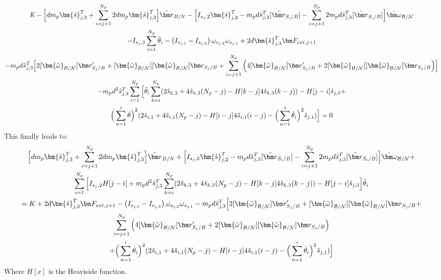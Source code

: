 \begin{multline}
	\textit{K} - \Big[d m_p\bm{\hat{s}}^{T}_{j,3}+\sum^{N_p}_{i=j+1}2 d m_p\bm{\hat{s}}^{T}_{j,3}\Big]\ddot{\bm r}_{B/N} - \Big[I_{s_j,2} \bm{\hat{s}}_{j,2}^T -m_p d \hat{s}^{T}_{j,3}[\tilde{{\bm r}}_{S_{i}/B}]-\sum^{N_p}_{i=j+1} 2 m_p d \hat{s}^{T}_{j,3}[\tilde{{\bm r}}_{S_{i}/B}]\Big]\dot{\bm\omega}_{\cal B/N} \\
	-I_{s_j,2} \sum^{N_p}_{i=1}\ddot{\theta}_i - \left( I_{s_{j,1}} - I_{s_{j,3}}\right) \omega_{s_{j,3}} \omega_{s_{j,1}}+ 2d\bm{\hat{s}}^{T}_{j,3}\bm F_{ext,j+1}\\
	-m_p d \hat{s}^{T}_{j,3}\Big[2[\bm{\tilde{\omega}}_{\cal B/N}]\bm r'_{S_{j}/B} + [\bm{\tilde{\omega}}_{\cal B/N}][\bm{\tilde{\omega}}_{\cal B/N}]\bm r_{S_{j}/B}+\sum^{N_p}_{i=j+1}\Big(4[\bm{\tilde{\omega}}_{\cal B/N}]\bm r'_{S_{j}/B} + 2[\bm{\tilde{\omega}}_{\cal B/N}][\bm{\tilde{\omega}}_{\cal B/N}]\bm r_{S_{j}/B} \Big)\Big]\\
	-m_p d^2 \hat{s}^{T}_{j,3}\sum^{N_p}_{i=1}\Big[\ddot{\theta}_i \sum^{N_p}_{k=i}(2\hat{s}_{k,3}+4\hat{s}_{k,3}(N_p-j) -H[k-j] 4\hat{s}_{k,3}(k-j)) - H[j-i]\hat{s}_{j,3} + \\
	\Big( \sum^{i}_{n=1} \dot{\theta}\Big)^2 (2\hat{s}_{i,1}+4\hat{s}_{i,1}(N_p-j) -H[i-j] 4\hat{s}_{i,1}(i-j) - \Big( \sum^{i}_{n=1} \dot{\theta}_i\Big)^2 \hat{s}_{j,1} ) \Big] = 0
\end{multline}
This finally leads to:
\begin{multline}
	\Big[d m_p\bm{\hat{s}}^{T}_{j,3}+\sum^{N_p}_{i=j+1}2 d m_p\bm{\hat{s}}^{T}_{j,3}\Big]\ddot{\bm r}_{B/N} + \Big[I_{s_j,2} \bm{\hat{s}}_{j,2}^T -m_p d \hat{s}^{T}_{j,3}[\tilde{{\bm r}}_{S_{i}/B}]-\sum^{N_p}_{i=j+1} 2 m_p d \hat{s}^{T}_{j,3}[\tilde{{\bm r}}_{S_{i}/B}]\Big]\dot{\bm\omega}_{\cal B/N} +\\
	\sum^{N_p}_{i=1}\Big[I_{s_j,2} H[j-i] + m_p d^2 \hat{s}^{T}_{j,3} \sum^{N_p}_{k=i}(2\hat{s}_{k,3}+4\hat{s}_{k,3}(N_p-j) -H[k-j] 4\hat{s}_{k,3}(k-j)) - H[j-i]\hat{s}_{j,3} \Big] \ddot{\theta}_i\\
	= K + 2d\bm{\hat{s}}^{T}_{j,3}\bm F_{ext,j+1} - \left( I_{s_{j,1}} - I_{s_{j,3}}\right) \omega_{s_{j,3}} \omega_{s_{j,1}} - m_p d \hat{s}^{T}_{j,3}\Big[2[\bm{\tilde{\omega}}_{\cal B/N}]\bm r'_{S_{j}/B} + [\bm{\tilde{\omega}}_{\cal B/N}][\bm{\tilde{\omega}}_{\cal B/N}]\bm r_{S_{j}/B}+\\
	\sum^{N_p}_{i=j+1}\Big(4[\bm{\tilde{\omega}}_{\cal B/N}]\bm r'_{S_{j}/B} + 2[\bm{\tilde{\omega}}_{\cal B/N}][\bm{\tilde{\omega}}_{\cal B/N}]\bm r_{S_{j}/B} \Big) \\
	+ \Big( \sum^{i}_{n=1} \dot{\theta}_i \Big)^2 (2\hat{s}_{i,1}+4\hat{s}_{i,1}(N_p-j) -H[i-j] 4\hat{s}_{i,1}(i-j) - \Big( \sum^{i}_{n=1} \dot{\theta}_i\Big)^2 \hat{s}_{j,1} )\Big]
	\label{eq:flexr}
\end{multline}
Where $H[x]$ is the Heaviside function.


